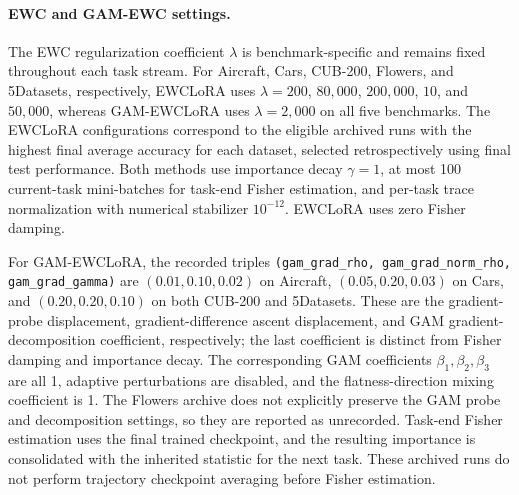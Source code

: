 \paragraph{EWC and GAM-EWC settings.}
The EWC regularization coefficient $\lambda$ is benchmark-specific
and remains fixed throughout each task stream.
For Aircraft, Cars, CUB-200, Flowers, and 5Datasets, respectively,
EWCLoRA uses $\lambda=200$, $80{,}000$, $200{,}000$, $10$, and
$50{,}000$, whereas GAM-EWCLoRA uses $\lambda=2{,}000$ on all five
benchmarks. The EWCLoRA configurations correspond to the eligible
archived runs with the highest final average accuracy for each dataset,
selected retrospectively using final test performance.
Both methods use importance decay $\gamma=1$, at most 100
current-task mini-batches for task-end Fisher estimation, and
per-task trace normalization with numerical stabilizer $10^{-12}$.
EWCLoRA uses zero Fisher damping.

For GAM-EWCLoRA, the recorded triples
\texttt{(gam\_grad\_rho, gam\_grad\_norm\_rho, gam\_grad\_gamma)}
are $(0.01,0.10,0.02)$ on Aircraft,
$(0.05,0.20,0.03)$ on Cars, and $(0.20,0.20,0.10)$ on both
CUB-200 and 5Datasets.
These are the gradient-probe displacement, gradient-difference ascent
displacement, and GAM gradient-decomposition coefficient, respectively;
the last coefficient is distinct from Fisher damping and importance decay.
The corresponding GAM coefficients $\beta_1,\beta_2,\beta_3$ are all 1,
adaptive perturbations are disabled, and the flatness-direction mixing
coefficient is 1. The Flowers archive does not explicitly preserve the
GAM probe and decomposition settings, so they are reported as unrecorded.
Task-end Fisher estimation uses the final trained checkpoint, and the
resulting importance is consolidated with the inherited statistic for
the next task. These archived runs do not perform trajectory checkpoint
averaging before Fisher estimation.
